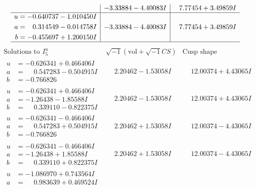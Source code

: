 \documentclass[1p]{elsarticle_modified}
\theoremstyle{definition}
\newcommand{\I}{\sqrt{-1}}
\begin{document}
$$\begin{array}{c|c|c}
 & -3.33884 - 4.40083 I & \phantom{-}7.77454 + 3.49859 I \\ \hline\begin{aligned}
u &= -0.640737 - 1.010450 I \\
a &= \phantom{-}0.314549 - 0.014758 I \\
b &= -0.455697 + 1.200150 I\end{aligned}
 & -3.33884 - 4.40083 I & \phantom{-}7.77454 + 3.49859 I\\
 \hline 
 \end{array}$$\newpage$$\begin{array}{c|c|c}  
\text{Solutions to }I^u_{5}& \I (\text{vol} + \sqrt{-1}CS) & \text{Cusp shape}\\
 \hline 
\begin{aligned}
u &= -0.626341 + 0.466406 I \\
a &= \phantom{-}0.547283 - 0.504915 I \\
b &= -0.766826\phantom{ +0.000000I}\end{aligned}
 & \phantom{-}2.20462 - 1.53058 I & \phantom{-}12.00374 + 4.43065 I \\ \hline\begin{aligned}
u &= -0.626341 + 0.466406 I \\
a &= -1.26438 - 1.85588 I \\
b &= \phantom{-}0.339110 - 0.822375 I\end{aligned}
 & \phantom{-}2.20462 - 1.53058 I & \phantom{-}12.00374 + 4.43065 I \\ \hline\begin{aligned}
u &= -0.626341 - 0.466406 I \\
a &= \phantom{-}0.547283 + 0.504915 I \\
b &= -0.766826\phantom{ +0.000000I}\end{aligned}
 & \phantom{-}2.20462 + 1.53058 I & \phantom{-}12.00374 - 4.43065 I \\ \hline\begin{aligned}
u &= -0.626341 - 0.466406 I \\
a &= -1.26438 + 1.85588 I \\
b &= \phantom{-}0.339110 + 0.822375 I\end{aligned}
 & \phantom{-}2.20462 + 1.53058 I & \phantom{-}12.00374 - 4.43065 I \\ \hline\begin{aligned}
u &= -1.086970 + 0.743564 I \\
a &= \phantom{-}0.983639 + 0.469524 I \\

\end{aligned}
\end{array}$$
\end{document}
